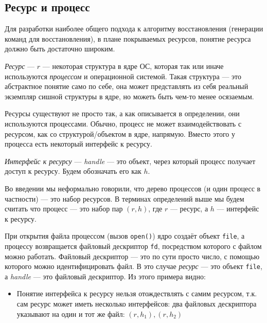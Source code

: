 \subsection{Ресурс и процесс}

Для разработки наиболее общего подхода к алгоритму восстановления (генерации команд для восстановления), в плане покрываемых ресурсов, понятие ресурса должно быть достаточно широким.

\begin{defn}
\label{def:resource}
\emph{Ресурс} --- $r$ --- некоторая структура в ядре ОС, которая так или иначе используются \emph{процессом} и операционной системой. 
Такая структура --- это абстрактное понятие само по себе, она может представлять из себя реальный экземпляр сишной структуры в ядре, но можеть быть чем-то менее осязаемым.
\end{defn}

Ресурсы существуют не просто так, а как описывается в определении, они используются процессами. Обычно, процесс не может взаимодействовать с ресурсом, как со структурой/объектом в ядре, напрямую. Вместо этого у процесса есть некоторый интерфейс к ресурсу.

\begin{defn}
\emph{Интерфейс к ресурсу} --- \textit{handle} --- это объект, через который процесс получает доступ к ресурсу. Будем обозначать его как $h$.
\end{defn}

Во введении мы неформально говорили, что дерево процессов (и один процесс в частности) --- это набор ресурсов. В терминах определений выше мы будем считать что процесс --- это набор пар $(r, h)$, где $r$ --- ресурс, а $h$ --- интерфейс к ресурсу.

\begin{exmp}
При открытия файла процессом (вызов \texttt{open()}) ядро создаёт объект \texttt{file}, а процессу возвращается файловый дескриптор \texttt{fd}, посредством которого с файлом можно работать. Файловый дескриптор --- это по сути просто число, с помощью которого можно идентифицировать файл. В это случае \emph{ресурс} --- это объект \texttt{file}, а \emph{handle} --- это файловый дескриптор. Из этого примера видно:
\begin{itemize}
	\item Понятие интерфейса к ресурсу нельзя отождествлять с самим ресурсом, т.к. сам ресурс может иметь несколько интерфейсов: два файловых дескриптора указывают на один и тот же файл: $(r, h_1), (r, h_2)$
\end{itemize}
\end{exmp}


